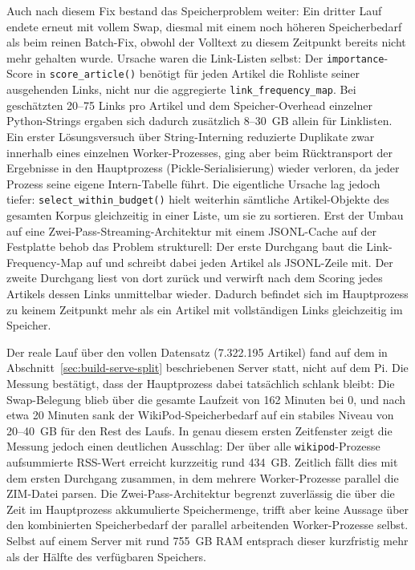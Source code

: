 Auch nach diesem Fix bestand das Speicherproblem weiter: Ein dritter Lauf endete erneut mit vollem Swap, diesmal mit einem noch höheren Speicherbedarf
als beim reinen Batch-Fix, obwohl der Volltext zu diesem Zeitpunkt bereits nicht mehr gehalten wurde. Ursache waren die Link-Listen selbst: Der
\texttt{importance}-Score in \texttt{score\_article()} benötigt für jeden Artikel die Rohliste seiner ausgehenden Links, nicht nur die aggregierte
\texttt{link\_\allowbreak{}frequency\_\allowbreak{}map}. Bei geschätzten 20--75 Links pro Artikel und dem Speicher-Overhead einzelner Python-Strings ergaben sich dadurch zusätzlich 8--30~GB allein für
Linklisten. Ein erster Lösungsversuch über String-Interning reduzierte Duplikate zwar innerhalb eines einzelnen Worker-Prozesses, ging aber beim Rücktransport der
Ergebnisse in den Hauptprozess (Pickle-Serialisierung) wieder verloren, da jeder Prozess seine eigene Intern-Tabelle führt. Die eigentliche Ursache lag jedoch tiefer:
\texttt{select\_\allowbreak{}within\_\allowbreak{}budget()} hielt weiterhin sämtliche Artikel-Objekte des gesamten Korpus gleichzeitig in einer Liste, um sie zu sortieren. Erst der
Umbau auf eine Zwei-Pass-Streaming-Architektur mit einem JSONL-Cache auf der Festplatte behob das Problem strukturell: Der erste Durchgang baut die Link-Frequency-Map
auf und schreibt dabei jeden Artikel als JSONL-Zeile mit. Der zweite Durchgang liest von dort zurück und verwirft nach dem Scoring jedes Artikels dessen Links unmittelbar wieder.
Dadurch befindet sich im Hauptprozess zu keinem Zeitpunkt mehr als ein Artikel mit vollständigen Links gleichzeitig im Speicher.

Der reale Lauf über den vollen Datensatz (7.322.195 Artikel) fand auf dem in Abschnitt~\ref{sec:build-serve-split} beschriebenen Server statt, nicht auf dem Pi. Die Messung bestätigt,
dass der Hauptprozess dabei tatsächlich schlank bleibt: Die Swap-Belegung blieb über die gesamte Laufzeit von 162 Minuten bei 0, und nach etwa 20 Minuten sank der WikiPod-Speicherbedarf
auf ein stabiles Niveau von 20--40~GB für den Rest des Laufs. In genau diesem ersten Zeitfenster zeigt die Messung jedoch einen deutlichen Ausschlag: Der über alle
\texttt{wikipod}-Prozesse aufsummierte RSS-Wert erreicht kurzzeitig rund 434~GB. Zeitlich fällt dies mit dem ersten Durchgang zusammen, in dem mehrere Worker-Prozesse parallel die 
ZIM-Datei parsen. Die Zwei-Pass-Architektur begrenzt zuverlässig die über die Zeit im Hauptprozess akkumulierte Speichermenge, trifft aber keine Aussage über den kombinierten Speicherbedarf der
parallel arbeitenden Worker-Prozesse selbst. Selbst auf einem Server mit rund 755~GB RAM entsprach dieser kurzfristig mehr als der Hälfte des verfügbaren Speichers.

